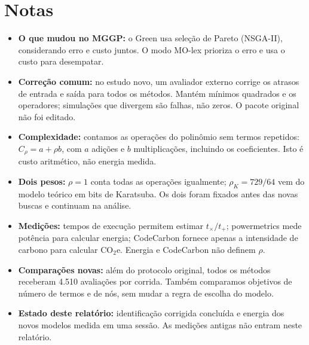 \section*{Notas}
\begin{itemize}
\item \textbf{O que mudou no MGGP:} o Green usa seleção de Pareto (NSGA-II), considerando erro e custo juntos. O modo MO-lex prioriza o erro e usa o custo para desempatar.
\item \textbf{Correção comum:} no estudo novo, um avaliador externo corrige os atrasos de entrada e saída para todos os métodos. Mantém mínimos quadrados e os operadores; simulações que divergem são falhas, não zeros. O pacote original não foi editado.
\item \textbf{Complexidade:} contamos as operações do polinômio sem termos repetidos: $C_\rho=a+\rho b$, com $a$ adições e $b$ multiplicações, incluindo os coeficientes. Isto é custo aritmético, não energia medida.
\item \textbf{Dois pesos:} $\rho=1$ conta todas as operações igualmente; $\rho_K=729/64$ vem do modelo teórico em bits de Karatsuba. Os dois foram fixados antes das novas buscas e continuam na análise.
\item \textbf{Medições:} tempos de execução permitem estimar $t_\times/t_+$; powermetrics mede potência para calcular energia; CodeCarbon fornece apenas a intensidade de carbono para calcular CO$_2$e. Energia e CodeCarbon não definem $\rho$.
\item \textbf{Comparações novas:} além do protocolo original, todos os métodos receberam 4.510 avaliações por corrida. Também comparamos objetivos de número de termos e de nós, sem mudar a regra de escolha do modelo.
\item \textbf{Estado deste relatório:} identificação corrigida concluída e energia dos novos modelos medida em uma sessão. As medições antigas não entram neste relatório.
\end{itemize}
